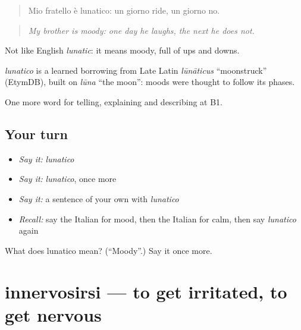 \begin{quote}
Mio fratello è lunatico: un giorno ride, un giorno no.
\end{quote}

\begin{quote}
\emph{My brother is moody: one day he laughs, the next he does not.}
\end{quote}

Not like English \emph{lunatic}: it means moody, full of ups and downs.

\begin{cousinweb}
\emph{lunatico} is a learned borrowing from Late Latin \emph{lūnāticus} \textquotedblleft{}moonstruck\textquotedblright{} (EtymDB), built on \emph{lūna} \textquotedblleft{}the moon\textquotedblright{}: moods were thought to follow its phases.
\end{cousinweb}

\begin{grammarlens}[title={What you've built}]
One more word for telling, explaining and describing at B1.
\end{grammarlens}

\subsection*{Your turn}
\begin{itemize}
\raggedright
  \item \emph{Say it:} \emph{lunatico}
  \item \emph{Say it:} \emph{lunatico}, once more
  \item \emph{Say it:} a sentence of your own with \emph{lunatico}
  \item \emph{Recall:} say the Italian for mood, then the Italian for calm, then say \emph{lunatico} again
\end{itemize}

\begin{tcolorbox}[breakable,colback=teal!4,colframe=teal!35!black,title={Before you move on}]
What does lunatico mean? (\textquotedblleft{}Moody\textquotedblright{}.) Say it once more.
\end{tcolorbox}
\section[innervosirsi]{innervosirsi — to get irritated, to get nervous}

\label{lesson:IT-C474-innervosirsi}



